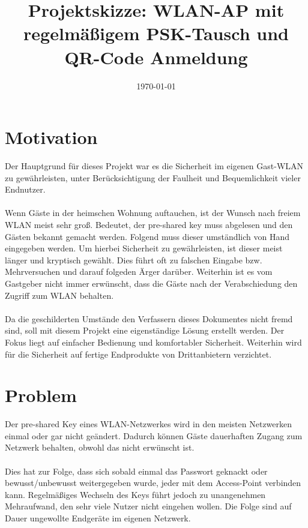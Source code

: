 \documentclass[a4paper,11pt,singlespacing]{article}
\title{Projektskizze: WLAN-AP mit regelmäßigem PSK-Tausch und QR-Code Anmeldung}
\date{\today}
\begin{document}
	\setlength{\parindent}{0ex}
	\maketitle
	
	\section{Motivation}
		Der Hauptgrund für dieses Projekt war es die Sicherheit im eigenen Gast-WLAN zu gewährleisten, unter Berücksichtigung der Faulheit und Bequemlichkeit vieler Endnutzer. \\ \\
	Wenn Gäste in der heimschen Wohnung auftauchen, ist der Wunsch nach freiem WLAN meist sehr groß. Bedeutet, der pre-shared key muss abgelesen und den Gästen bekannt gemacht werden. Folgend muss dieser umständlich von Hand eingegeben werden. Um hierbei Sicherheit zu gewährleisten, ist dieser meist länger und kryptisch gewählt. Dies führt oft zu falschen Eingabe bzw. Mehrversuchen und darauf folgeden Ärger darüber. Weiterhin ist es vom Gastgeber nicht immer erwünscht, dass die Gäste nach der Verabschiedung den Zugriff zum WLAN behalten. \\ \\
	Da die geschilderten Umstände den Verfassern dieses Dokumentes nicht fremd sind, soll mit diesem Projekt eine eigenständige Lösung erstellt werden. Der Fokus liegt auf einfacher Bedienung und komfortabler Sicherheit. Weiterhin wird für die Sicherheit auf fertige Endprodukte von Drittanbietern verzichtet. 
	
	\section{Problem}
	Der pre-shared Key eines WLAN-Netzwerkes wird in den meisten Netzwerken einmal oder gar nicht geändert. Dadurch können Gäste dauerhaften Zugang zum Netzwerk behalten, obwohl das nicht erwünscht ist.  \\ \\ 
	Dies hat zur Folge, dass sich sobald einmal das Passwort geknackt oder bewusst/unbewusst weitergegeben wurde, jeder mit dem Access-Point verbinden kann. Regelmäßiges Wechseln des Keys führt jedoch zu unangenehmen Mehraufwand, den sehr viele Nutzer nicht eingehen wollen. Die Folge sind auf Dauer ungewollte Endgeräte im eigenen Netzwerk.
	
\end{document}
